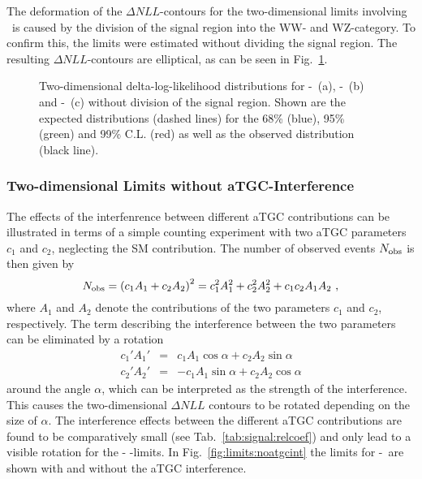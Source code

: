 \noindent The deformation of the $\Delta NLL$-contours for the two-dimensional limits involving \Tcb \ is caused by the division of the signal region into the WW- and WZ-category. To confirm this, the limits were estimated without dividing the signal region. The resulting $\Delta NLL$-contours are elliptical, as can be seen in Fig.~\ref{fig:limits:2dlimits_nocat}.

\begin{figure}
	\centering
	\caption[Two-dimensional delta-log-likelihood distributions for the three combinations of aTGC parameters without division of the signal region]{Two-dimensional delta-log-likelihood distributions for \Tcwww -\Tccw \ (a), \Tcwww -\Tcb \ (b) and \Tccw -\Tcb\ (c) without division of the signal region. Shown are the expected distributions (dashed lines) for the 68\% (blue), 95\% (green) and 99\% C.L. (red) as well as the observed distribution (black line).}
	\label{fig:limits:2dlimits_nocat}	
\end{figure}
\subsubsection*{Two-dimensional Limits without aTGC-Interference}
The effects of the interfenrence between different aTGC contributions can be illustrated in terms of a simple counting experiment with two aTGC parameters $c_1$ and $c_2$, neglecting the SM contribution. The number of observed events $N_{\rm obs}$ is then given by
\begin{equation}
N_{\rm obs} = \left( c_1A_1 + c_2A_2 \right)^2 = c_1^2A_1^2 + c_2^2A_2^2 + c_1c_2A_1A_2 ~,
\end{equation}
where $A_1$ and $A_2$ denote the contributions of the two parameters $c_1$ and $c_2$, respectively. The term describing the interference between the two parameters can be eliminated by a rotation
\begin{eqnarray}
c_1'A_1' &=& c_1A_1\cos \alpha + c_2A_2\sin \alpha \\
c_2'A_2' &=& -c_1A_1\sin \alpha + c_2A_2\cos \alpha
\end{eqnarray}
around the angle $\alpha$, which can be interpreted as the strength of the interference. This causes the two-dimensional $\Delta NLL$ contours to be rotated depending on
the size of $\alpha$. The interference effects between the different aTGC contributions are found to be comparatively small (see Tab.~\ref{tab:signal:relcoef}) and only lead to a visible rotation for the \Tccw - \Tcb -limits. In Fig.~\ref{fig:limits:noatgcint} the limits for \Tccw -\Tcb \ are shown with and without the aTGC interference.

